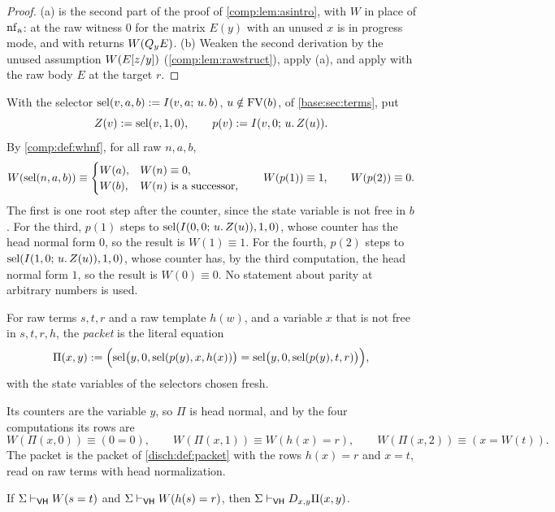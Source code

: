 \begin{proof}
(a) is the second part of the proof of \cref{comp:lem:asintro}, with $W$ in
place of $\operatorname{nf}_{\mathrm a}$:  at the raw witness $0$ for the
matrix $E(y)$ with an unused $x$ is in progress mode, and  with
 returns $W(Q_{y}E)$. (b) Weaken the second derivation by the
unused assumption $W(E[z/y])$ (\cref{comp:lem:rawstruct}), apply (a),
and apply  with the raw body $E$ at the target $r$.
\end{proof}

With the selector $\operatorname{sel}(v,a,b)\mathrel{:=}I(v,a;\,u.\,b)$, $u\notin\operatorname{FV}(b)$, of
\cref{base:sec:terms}, put
\[
 Z(v)\mathrel{:=}\operatorname{sel}(v,1,0),\qquad p(v)\mathrel{:=}I(v,0;\,u.\,Z(u)).
\]
By \cref{comp:def:whnf}, for all raw $n,a,b$,
\[
 W(\operatorname{sel}(n,a,b))\equiv
 \begin{cases}
  W(a), & W(n)\equiv0,\\
  W(b), & W(n)\text{ is a successor},
 \end{cases}
 \qquad
 W(p(1))\equiv1,\qquad W(p(2))\equiv0.
\]
The first is one root step after the counter, since the state variable is
not free in $b$. For the third, $p(1)$ steps to
$\operatorname{sel}(I(0,0;\,u.\,Z(u)),1,0)$, whose counter has the head normal form $0$, so
the result is $W(1)\equiv1$. For the fourth, $p(2)$ steps to
$\operatorname{sel}(I(1,0;\,u.\,Z(u)),1,0)$, whose counter has, by the third computation,
the head normal form $1$, so the result is $W(0)\equiv0$. No statement about
parity at arbitrary numbers is used.

\begin{definition}
\label{comp:def:whpacket}
For raw terms $s,t,r$ and a raw template $h(w)$, and a variable $x$ that is
not free in $s,t,r,h$, the \emph{packet} is the literal equation
\[
 \Pi(x,y)\mathrel{:=}\Bigl(
 \operatorname{sel}\bigl(y,0,\operatorname{sel}(p(y),x,h(x))\bigr)=
 \operatorname{sel}\bigl(y,0,\operatorname{sel}(p(y),t,r)\bigr)\Bigr),
\]
with the state variables of the selectors chosen fresh.
\end{definition}

Its counters are the variable $y$, so $\Pi$ is head normal, and by the four
computations its rows are
\[
 W(\Pi(x,0))\equiv(0=0),\qquad
 W(\Pi(x,1))\equiv W(h(x)=r),\qquad
 W(\Pi(x,2))\equiv(x=W(t)).
\]
The packet is the packet of \cref{disch:def:packet} with the rows
$h(x)=r$ and $x=t$, read on raw terms with head normalization.

\begin{lemma}
\label{comp:lem:whpacket}
If $\Sigma\vdash_{\mathsf{VH}}W(s=t)$ and
$\Sigma\vdash_{\mathsf{VH}}W(h(s)=r)$, then
$\Sigma\vdash_{\mathsf{VH}}D_{x,y}\Pi(x,y)$.
\end{lemma}

